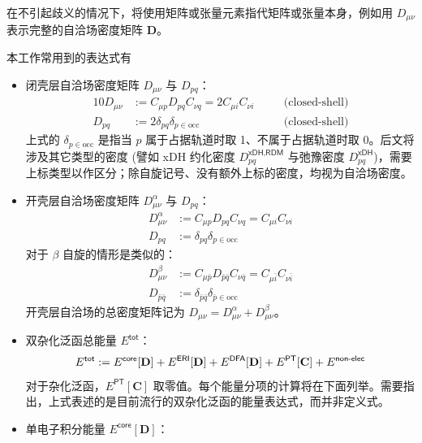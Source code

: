 在不引起歧义的情况下，将使用矩阵或张量元素指代矩阵或张量本身，例如用 $D_{\mu \nu}$ 表示完整的自洽场密度矩阵 $\mathbf{D}$。

本工作常用到的表达式有
\begin{itemize}[nosep]
  \item 闭壳层自洽场密度矩阵 $D_{\mu \nu}$ 与 $D_{pq}$：
        \begin{alignat}{10}
          \label{eq.3.def.dm-scf-closed}
          D_{\mu \nu} &:= C_{\mu p} D_{pq} C_{\nu q} = 2 C_{\mu i} C_{\nu i} \quad &&\text{(closed-shell)} \\
          D_{pq} &:= 2 \delta_{pq} \delta_{p \in \mathrm{occ}} \quad &&\text{(closed-shell)}
        \end{alignat}
        上式的 $\delta_{p \in \mathrm{occ}}$ 是指当 $p$ 属于占据轨道时取 1、不属于占据轨道时取 0。后文将涉及其它类型的密度 (譬如 xDH 约化密度 $D_{pq}^{\textsf{xDH}, \textsf{RDM}}$ 与弛豫密度 $D_{pq}^{\textsf{xDH}}$)，需要上标类型以作区分；除自旋记号、没有额外上标的密度，均视为自洽场密度。
  \item 开壳层自洽场密度矩阵 $D_{\mu \nu}^\alpha$ 与 $D_{pq}$：
        \begin{align}
          D_{\mu \nu}^\alpha &:= C_{\mu p} D_{pq} C_{\nu q} = C_{\mu i} C_{\nu i} \\
          D_{pq} &:= \delta_{pq} \delta_{p \in \mathrm{occ}}
        \end{align}
        对于 $\beta$ 自旋的情形是类似的：
        \begin{align}
          D_{\mu \nu}^\beta &:= C_{\mu \bar p} D_{\bar p \bar q} C_{\nu \bar q} = C_{\mu \bar i} C_{\nu \bar i} \\
          D_{\bar p \bar q} &:= \delta_{\bar p \bar q} \delta_{\bar p \in \mathrm{occ}}
        \end{align}
        开壳层自洽场的总密度矩阵记为 $D_{\mu \nu} = D_{\mu \nu}^\alpha + D_{\mu \nu}^\beta$。
  \item 双杂化泛函总能量 $E^\textsf{tot}$：
        \begin{equation}
          \label{eq.3.def-E-tot}
          E^\textsf{tot} := E^\textsf{core} [\mathbf{D}] + E^\textsf{ERI} [\mathbf{D}] + E^\textsf{DFA} [\mathbf{D}] + E^\textsf{PT} [\mathbf{C}] + E^\textsf{non-elec} \\
        \end{equation}
        对于杂化泛函，$E^\textsf{PT} [\mathbf{C}]$ 取零值。每个能量分项的计算将在下面列举。需要指出，上式表述的是目前流行的双杂化泛函的能量表达式，而并非定义式。
  \item 单电子积分能量 $E^\textsf{core} [\mathbf{D}]$：

\end{itemize}
